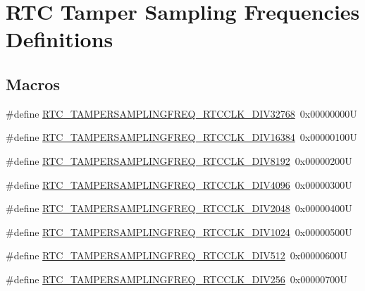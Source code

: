 \hypertarget{group___r_t_c_ex___tamper___sampling___frequencies___definitions}{}\section{R\+TC Tamper Sampling Frequencies Definitions}
\label{group___r_t_c_ex___tamper___sampling___frequencies___definitions}
\subsection*{Macros}
\begin{DoxyCompactItemize}
\item 
\#define \hyperlink{group___r_t_c_ex___tamper___sampling___frequencies___definitions_ga1d12bab8de77c51edc1b6a7a2e242991}{R\+T\+C\+\_\+\+T\+A\+M\+P\+E\+R\+S\+A\+M\+P\+L\+I\+N\+G\+F\+R\+E\+Q\+\_\+\+R\+T\+C\+C\+L\+K\+\_\+\+D\+I\+V32768}~0x00000000U
\item 
\#define \hyperlink{group___r_t_c_ex___tamper___sampling___frequencies___definitions_gab45c084cd1f2f36ecb19d7eb4e7c12b2}{R\+T\+C\+\_\+\+T\+A\+M\+P\+E\+R\+S\+A\+M\+P\+L\+I\+N\+G\+F\+R\+E\+Q\+\_\+\+R\+T\+C\+C\+L\+K\+\_\+\+D\+I\+V16384}~0x00000100U
\item 
\#define \hyperlink{group___r_t_c_ex___tamper___sampling___frequencies___definitions_ga48899e13c9b392c02278cd4166b49f4d}{R\+T\+C\+\_\+\+T\+A\+M\+P\+E\+R\+S\+A\+M\+P\+L\+I\+N\+G\+F\+R\+E\+Q\+\_\+\+R\+T\+C\+C\+L\+K\+\_\+\+D\+I\+V8192}~0x00000200U
\item 
\#define \hyperlink{group___r_t_c_ex___tamper___sampling___frequencies___definitions_gaa8257b2329aa2d170b66b7368c11943a}{R\+T\+C\+\_\+\+T\+A\+M\+P\+E\+R\+S\+A\+M\+P\+L\+I\+N\+G\+F\+R\+E\+Q\+\_\+\+R\+T\+C\+C\+L\+K\+\_\+\+D\+I\+V4096}~0x00000300U
\item 
\#define \hyperlink{group___r_t_c_ex___tamper___sampling___frequencies___definitions_ga681034d8247a44679e3ae277db187cb5}{R\+T\+C\+\_\+\+T\+A\+M\+P\+E\+R\+S\+A\+M\+P\+L\+I\+N\+G\+F\+R\+E\+Q\+\_\+\+R\+T\+C\+C\+L\+K\+\_\+\+D\+I\+V2048}~0x00000400U
\item 
\#define \hyperlink{group___r_t_c_ex___tamper___sampling___frequencies___definitions_gaad315c353bdd84397cb1d7db46c71cd3}{R\+T\+C\+\_\+\+T\+A\+M\+P\+E\+R\+S\+A\+M\+P\+L\+I\+N\+G\+F\+R\+E\+Q\+\_\+\+R\+T\+C\+C\+L\+K\+\_\+\+D\+I\+V1024}~0x00000500U
\item 
\#define \hyperlink{group___r_t_c_ex___tamper___sampling___frequencies___definitions_ga3748ae21496570bdc54354c7d9a8c91d}{R\+T\+C\+\_\+\+T\+A\+M\+P\+E\+R\+S\+A\+M\+P\+L\+I\+N\+G\+F\+R\+E\+Q\+\_\+\+R\+T\+C\+C\+L\+K\+\_\+\+D\+I\+V512}~0x00000600U
\item 
\#define \hyperlink{group___r_t_c_ex___tamper___sampling___frequencies___definitions_ga05ce782cafcbf04e6854739041052a9e}{R\+T\+C\+\_\+\+T\+A\+M\+P\+E\+R\+S\+A\+M\+P\+L\+I\+N\+G\+F\+R\+E\+Q\+\_\+\+R\+T\+C\+C\+L\+K\+\_\+\+D\+I\+V256}~0x00000700U
\end{DoxyCompactItemize}


